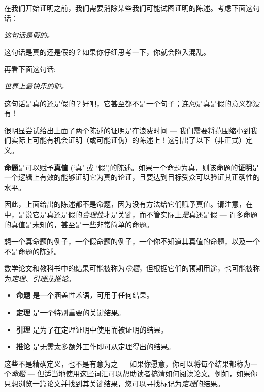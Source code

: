 
在我们开始证明之前，我们需要消除某些我们可能试图证明的陈述。考虑下面这句话：

\begin{center} \textit{这句话是假的。} \end{center}
这句话是真的还是假的？如果你仔细思考一下，你就会陷入混乱。

再看下面这句话:
\begin{center} \textit{世界上最快乐的驴。} \end{center}
这句话是真的还是假的？好吧，它甚至都不是一个句子；连\textit{问}是真是假的意义都没有！

很明显尝试给出上面了两个陈述的证明是在浪费时间 --- 我们需要将范围缩小到我们实际上可能有机会证明（或可能证伪）的陈述上！这引出了以下（非正式）定义。

\begin{definition}
\label{defProposition}
\label{defProof}
\textbf{命题}是可以赋予\textbf{真值} (`真' 或 `假')的陈述。如果一个命题为真，则该命题的\textbf{证明}是一个逻辑上有效的能够证明它为真的论证，且要达到目标受众可以验证其正确性的水平。
\end{definition}

因此，上面给出的陈述都不是命题，因为没有方法给它们赋予真值。请注意，在  中，是说它是真还是假的\textit{合理性}才是关键，而不管实际上\textit{是}真还是假 --- 许多命题的真值是未知的，甚至是一些非常简单的命题。

\begin{exercise}
想一个真命题的例子，一个假命题的例子，一个你不知道其真值的命题，以及一个不是命题的陈述。
\end{exercise}

数学论文和教科书中的结果可能被称为\textit{命题}，但根据它们的预期用途，也可能被称为\textit{定理}、\textit{引理}或\textit{推论}。

\begin{itemize} 
\item \textbf{命题} 是一个涵盖性术语，可用于任何结果。
\item \textbf{定理} 是一个特别重要的关键结果。
\item \textbf{引理} 是为了在定理证明中使用而被证明的结果。
\item \textbf{推论} 是无需太多额外工作即可从定理得出的结果。
\end{itemize}

这些不是精确定义，也不是有意为之 --- 如果你愿意，你可以将每个结果都称为一个\textit{命题} --- 但适当地使用这些词汇可以帮助读者搞清如何阅读论文。例如，如果你只想浏览一篇论文并找到其关键结果，您可以寻找标记为\textit{定理}的结果。

